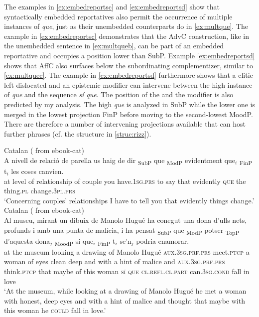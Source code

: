 The examples in \eqref{ex:embedreportsc} and \eqref{ex:embedreportsd} show that  syntactically embedded reportatives also permit the occurrence of  multiple instances of \emph{que}, just as  their unembedded counterparts do in \eqref{ex:multque}. The example in \eqref{ex:embedreportsc} demonstrates that the AdvC construction, like in the unembedded sentence in \eqref{ex:multqueb}, can be part of an embedded reportative and occupies a position lower than SubP. Example \eqref{ex:embedreportsd} shows that AffC also surfaces below the subordinating complementizer, similar to  \eqref{ex:multquec}.  The example in \eqref{ex:embedreportsd} furthermore shows that a clitic left dislocated  and an epistemic modifier can intervene between the high instance of \emph{que} and the sequence \emph{sí que}. The position of the  and the modifier is also predicted by my analysis. The high \emph{que} is analyzed in  SubP while the lower one is merged in the lowest projection FinP before moving to the second-lowest MoodP. There are therefore a number of intervening projections available that can host further phrases (cf. the structure in \ref{struc:rizz}).

\ea\label{ex:embedreportsc} 
Catalan (\citealt[35: ex 57a]{Kocher2017a} from ebook-cat)\\ 
\gll A nivell de relació de parella us haig de dir {\ob}\textsubscript{SubP} que{\cb}  {\ob}\textsubscript{ModP} evidentment que$_i${\cb} {\ob}\textsubscript{FinP} t$_i${\cb} les coses canvien.  \\
at level of relationship of couple you have.\textsc{1sg.prs} to say {} that {} evidently \textsc{que} {} {} the thing.\textsc{pl} change.\textsc{3pl.prs}\\
\glt `Concerning couples' relationships I have to tell you that evidently things change.' 
\ex\label{ex:embedreportsd} 
Catalan (\citealt[35: ex 57c]{Kocher2017a} from ebook-cat)\\ 
\gll Al museu, mirant un dibuix de Manolo Hugué ha conegut una dona d’ulls nets, profunds i amb una punta de malícia, i ha pensat  {\ob}\textsubscript{SubP} que{\cb}  {\ob}\textsubscript{ModP} potser{\cb} {\ob}\textsubscript{TopP}  d’aquesta dona$_j${\cb} {\ob}\textsubscript{MoodP} sí que$_i${\cb} {\ob}\textsubscript{FinP} t$_i${\cb}  se’n$_j$ podria enamorar.  \\
{at the} museum looking a drawing of Manolo Hugué \textsc{aux.3sg.prf.prs} meet.\textsc{ptcp} a woman {of eyes} clean deep and with a hint of malice and \textsc{aux.3sg.prf.prs} think.\textsc{ptcp} {} that {} maybe {} {of this} woman {} \textsc{sí} \textsc{que} {} {} {\textsc{cl.refl}.\textsc{cl.part}} can.\textsc{3sg.cond} {fall in love}\\
\glt `At the museum, while looking at a drawing of Manolo Hugué he met a woman with honest, deep eyes and with a hint of malice and thought that maybe with this woman he \textsc{could} fall in love.' 
\z




